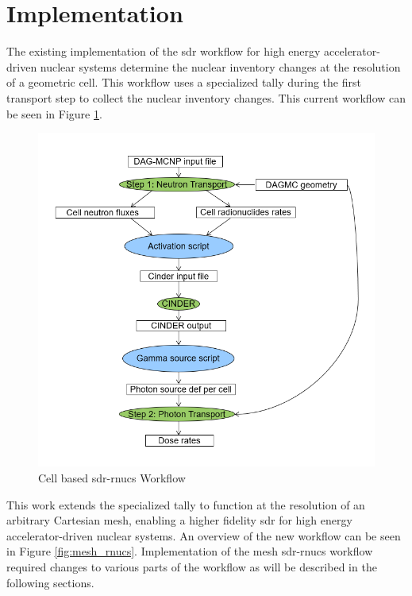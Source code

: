 \section{Implementation}
The existing implementation of the \gls{sdr} workflow for high energy
accelerator-driven nuclear systems determine the nuclear
inventory changes at the resolution of a geometric cell. This workflow uses a
specialized tally during the first transport step to collect the nuclear
inventory changes. This current workflow can be seen in Figure
\ref{fig:cell_rnucs}.
\begin{figure}[H]
	\centering
	\includegraphics[scale=0.4]{../figs/rnucs_r2s.png}
	\caption{Cell based \gls{sdr}-rnucs Workflow}
	\label{fig:cell_rnucs}
\end{figure}
%
This work extends the specialized tally to function at the resolution of an
arbitrary Cartesian mesh, enabling a higher fidelity \gls{sdr} for high energy
accelerator-driven nuclear systems. An overview of the new workflow can be seen
in Figure  \ref{fig:mesh_rnucs}.
Implementation of the mesh \gls{sdr}-rnucs workflow required changes to
various parts of the workflow as will be described in the following sections.
